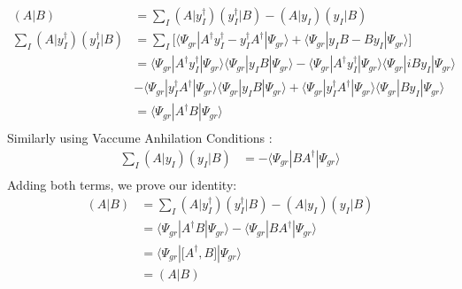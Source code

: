 \documentclass[11pt, oneside]{article}   	%
\begin{document}
    \begin{equation*}\label{eq:resolution of identity}
      \begin{aligned}
        (A|B)&=\sum_I (A|y_I^\dagger)(y_I^\dagger|B)-(A|y_I)(y_I|B)\\
	\sum_I(A|y_I^\dagger)(y_I^\dagger|B)&=\sum_I \big[ \big \langle \Psi_{gr}|A^\dagger y_I^\dagger-y_I^\dagger A^\dagger|\Psi_{gr} \big \rangle +
	\big \langle \Psi_{gr}| y_I B- B y_I |\Psi_{gr} \big \rangle \big]\\
	&=\big \langle \Psi_{gr}| A^\dagger y_I^\dagger |\Psi_{gr} \big \rangle \big \langle \Psi_{gr}|y_I B|\Psi_{gr} \big \rangle 
	-\big \langle \Psi_{gr}| A^\dagger y_I^\dagger |\Psi_{gr} \big \rangle \big \langle \Psi_{gr}|iB y_I |\Psi_{gr} \big \rangle\\ 
	&-\big \langle \Psi_{gr}| y_I^\dagger A^\dagger |\Psi_{gr} \big \rangle \big \langle \Psi_{gr}|y_I B|\Psi_{gr} \big \rangle 
	+\big \langle \Psi_{gr}|  y_I^\dagger A^\dagger|\Psi_{gr} \big \rangle \big \langle \Psi_{gr}|B y_I|\Psi_{gr} \big \rangle \\
	&=\big \langle \Psi_{gr}| A^\dagger B|\Psi_{gr} \big \rangle  \\
      \end{aligned}
    \end{equation*}
    Similarly using Vaccume Anhilation Conditions :
    \begin{equation*}
      \begin{aligned}
	\sum_I (A|y_I)(y_I|B) &=-\big \langle \Psi_{gr}|B A^\dagger |\Psi_{gr} \big \rangle \\
      \end{aligned}
    \end{equation*}
    Adding both terms, we prove our identity:
    \begin{equation*}\label{eq:resolution of identity}
      \begin{aligned}
        (A|B)&=\sum_I (A|y_I^\dagger)(y_I^\dagger|B)-(A|y_I)(y_I|B)\\
	&=\big \langle \Psi_{gr}| A^\dagger B|\Psi_{gr} \big \rangle -\big \langle \Psi_{gr}|B A^\dagger |\Psi_{gr} \big \rangle \\
	&=\big \langle \Psi_{gr}|\big[A^\dagger,B\big] |\Psi_{gr} \big \rangle \\
	&=(A|B)\\
      \end{aligned}
    \end{equation*}
\end{document}
